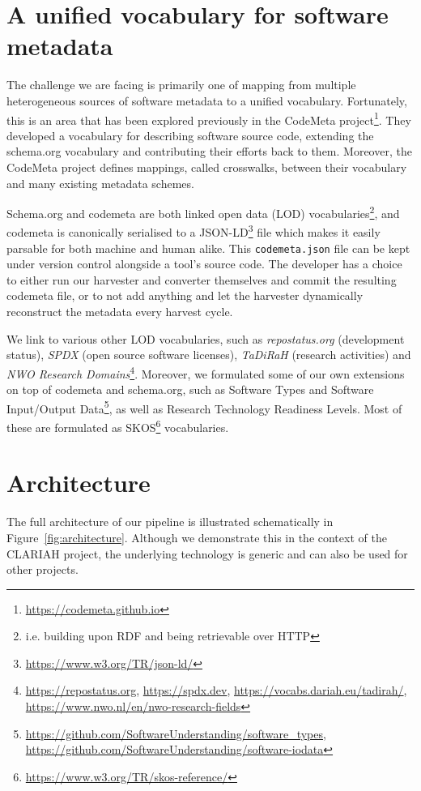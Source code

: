 \documentclass[a4paper,11pt]{article}
\begin{document}
\section{A unified vocabulary for software metadata}

The challenge we are facing is primarily one of mapping from multiple
heterogeneous sources of software metadata to a unified vocabulary.
Fortunately, this is an area that has been explored previously in the CodeMeta
project\footnote{\url{https://codemeta.github.io}}. They developed a
vocabulary for describing software source code, extending the
schema.org vocabulary and contributing their efforts back to them. Moreover,
the CodeMeta project defines mappings, called crosswalks, between their
vocabulary and many existing metadata schemes. 

Schema.org and codemeta are both linked open data (LOD)
vocabularies\footnote{i.e. building upon RDF and being retrievable over HTTP},
and codemeta is canonically serialised to a
JSON-LD\footnote{\url{https://www.w3.org/TR/json-ld/}} file which makes it
easily parsable for both machine and human alike. This \texttt{codemeta.json}
file can be kept under version control alongside a tool's source code. The
developer has a choice to either run our harvester and converter themselves and
commit the resulting codemeta file, or to not add anything and let the harvester
dynamically reconstruct the metadata every harvest cycle.

We link to various other LOD vocabularies, such as
\emph{repostatus.org} (development
status), \emph{SPDX} (open source software
licenses), \emph{TaDiRaH} (research activities) \citep{TADIRAH} and \emph{NWO Research Domains}\footnote{\url{https://repostatus.org}, \url{https://spdx.dev}, \url{https://vocabs.dariah.eu/tadirah/}, \url{https://www.nwo.nl/en/nwo-research-fields}}.
Moreover, we formulated some of our own extensions on top of codemeta and
schema.org, such as Software
Types and Software Input/Output
Data\footnote{\url{https://github.com/SoftwareUnderstanding/software_types}, \url{https://github.com/SoftwareUnderstanding/software-iodata}},
as well as Research Technology Readiness Levels. Most of these are formulated as SKOS\footnote{\url{https://www.w3.org/TR/skos-reference/}}
vocabularies.

\section{Architecture}

The full architecture of our pipeline is illustrated schematically in
Figure~\ref{fig:architecture}. Although we demonstrate this in the context of the
CLARIAH project, the underlying technology is generic and can also be used for
other projects.
\end{document}
